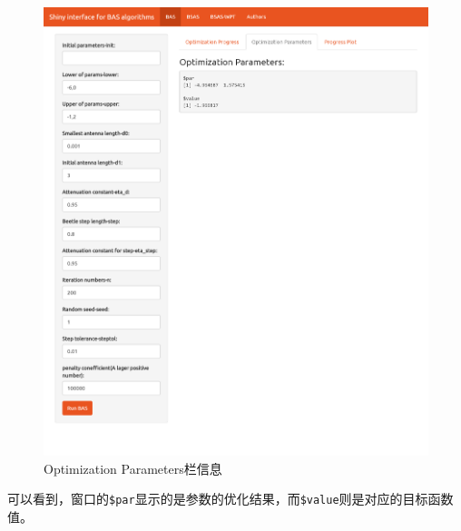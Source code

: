 \documentclass[]{ctexbook}
\theoremstyle{definition}
\theoremstyle{definition}
\theoremstyle{definition}
\theoremstyle{remark}
\begin{document}
\begin{figure}

{\centering \includegraphics[width=0.95\linewidth]{img/app3} 

}

\caption{Optimization Parameters栏信息}\label{fig:basparms}
\end{figure}

可以看到，窗口的\texttt{\$par}显示的是参数的优化结果，而\texttt{\$value}则是对应的目标函数值。
\end{document}

